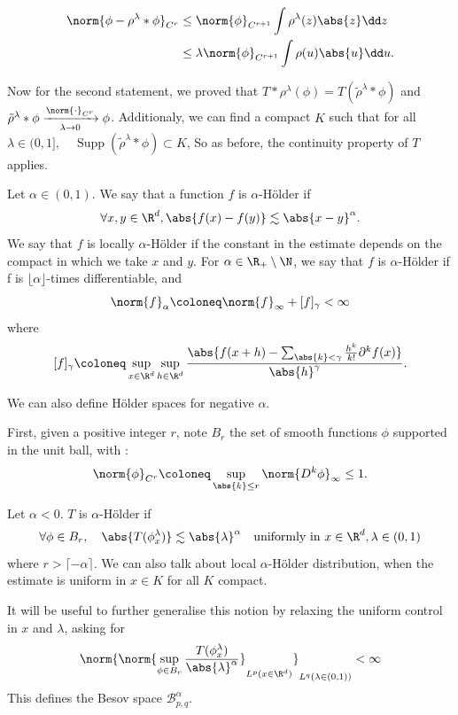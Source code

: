 \begin{align*}
    \norm{\phi - \rho^\lambda * \phi}_{C^r} &\leq \norm{\phi}_{C^{r+1}} \int \rho^\lambda(z) \abs{z} \dd z \\
    &\leq \lambda \norm{\phi}_{C^{r+1}} \int \rho(u) \abs{u} \dd u.
\end{align*}

Now for the second statement, we proved that $T*\rho^\lambda(\phi) = T(\tilde{\rho}^\lambda*\phi)$ and $\tilde{\rho}^\lambda*\phi \xrightarrow[\lambda \to 0]{\norm{\cdot}_{C^r}} \phi$.
Additionaly, we can find a compact $K$ such that for all $\lambda\in (0,1],\quad \operatorname{Supp}(\tilde{\rho}^\lambda*\phi)\subset K$, 
So as before, the continuity property of $T$ applies.


\begin{definition}
    Let $\alpha \in (0,1)$. We say that a function $f$ is $\alpha$-Hölder if 
    $$\forall x,y \in \R^d, \abs{f(x)- f(y)} \lesssim \abs{x-y}^\alpha.$$
    We say that $f$ is locally $\alpha$-Hölder if the constant in the estimate depends on the compact in which we take $x$ and $y$.
    For $\alpha \in \R_+ \setminus \N$, we say that $f$ is $\alpha$-Hölder if f is $\lfloor \alpha \rfloor$-times differentiable, and
    $$\norm{f}_\alpha \coloneq \norm{f}_{\infty} + [f]_\gamma < \infty $$
    where 
    $$[f]_\gamma \coloneq \sup_{x\in \R^d} \sup_{h\in \R^d} \frac{\abs{f(x+h) - \sum_{\abs{k}<\gamma} \frac{h^k}{k!}\partial^kf(x)}}{\abs{h}^\gamma}.$$
\end{definition}

We can also define Hölder spaces for negative $\alpha$.

First, given a positive integer $r$, note $B_r$ the set of smooth functions $\phi$ supported in the unit ball, with :
$$\norm{\phi}_{C^r}\coloneq \sup_{\abs{k}\leq r} \norm{D^k \phi}_\infty \leq 1.$$
\begin{definition}
    Let $\alpha<0$. $T$ is $\alpha$-Hölder if 
    $$\forall \phi \in B_r, \quad \abs{T(\phi^\lambda_x)} \lesssim \abs{\lambda}^\alpha \quad \text{uniformly in } x\in \R^d,\lambda \in (0,1)$$
    where $r>\lceil - \alpha \rceil$.
    We can also talk about local $\alpha$-Hölder distribution, when the estimate is uniform in $x \in K$ for all $K$ compact.
    
    It will be useful to further generalise this notion by relaxing the uniform control in $x$ and $\lambda$, asking for 
    $$\norm{\norm{ \sup_{\phi \in B_r}\frac{T(\phi^\lambda_x)}{\abs{\lambda}^\alpha}}_{L^p(x\in \R^d)}}_{L^q(\lambda\in(0,1))} < \infty$$
    This defines the Besov space $\mathcal{B}^\alpha_{p,q}$.
\end{definition}


